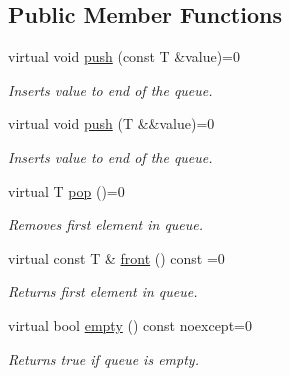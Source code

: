 \subsection*{Public Member Functions}
\begin{DoxyCompactItemize}
\item 
\mbox{\label{classlab_1_1impl_1_1IQueue_a9556cf62ce5ef96627fa2c2781615aab}} 
virtual void \hyperlink{classlab_1_1impl_1_1IQueue_a9556cf62ce5ef96627fa2c2781615aab}{push} (const T \&value)=0
\begin{DoxyCompactList}\small\item\em Inserts value to end of the queue. \end{DoxyCompactList}\item 
\mbox{\label{classlab_1_1impl_1_1IQueue_a27c506405003a4b28bbd2c1a57589dad}} 
virtual void \hyperlink{classlab_1_1impl_1_1IQueue_a27c506405003a4b28bbd2c1a57589dad}{push} (T \&\&value)=0
\begin{DoxyCompactList}\small\item\em Inserts value to end of the queue. \end{DoxyCompactList}\item 
\mbox{\label{classlab_1_1impl_1_1IQueue_abdb1a94620a77e5a193b0c7ed742232f}} 
virtual T \hyperlink{classlab_1_1impl_1_1IQueue_abdb1a94620a77e5a193b0c7ed742232f}{pop} ()=0
\begin{DoxyCompactList}\small\item\em Removes first element in queue. \end{DoxyCompactList}\item 
\mbox{\label{classlab_1_1impl_1_1IQueue_a4b0c950ff62dba782584a969e788f5a5}} 
virtual const T \& \hyperlink{classlab_1_1impl_1_1IQueue_a4b0c950ff62dba782584a969e788f5a5}{front} () const =0
\begin{DoxyCompactList}\small\item\em Returns first element in queue. \end{DoxyCompactList}\item 
\mbox{\label{classlab_1_1impl_1_1IQueue_a593e9263fbdcf840a05a21c6d8126213}} 
virtual bool \hyperlink{classlab_1_1impl_1_1IQueue_a593e9263fbdcf840a05a21c6d8126213}{empty} () const noexcept=0
\begin{DoxyCompactList}\small\item\em Returns true if queue is empty. \end{DoxyCompactList}\end{DoxyCompactItemize}


